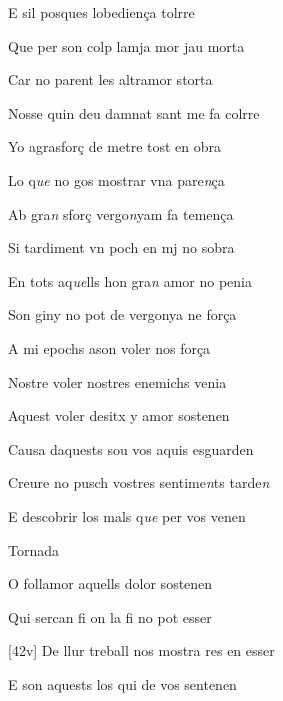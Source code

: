 \documentclass[12pt]{article}
\begin{document}
\begin{estrofa}

 E sil posques lobedien\c{c}a tolrre

 Que per son colp lamja mor jau morta

 Car no parent les altramor storta

 Nosse quin deu damnat sant me fa colrre

 Yo agrasfor\c{c} de metre tost en obra

 Lo q\textit{ue} no gos mostrar vna pare\textit{n}\c{c}a

 Ab gra\textit{n} sfor\c{c} vergo\textit{n}yam fa temen\c{c}a

 Si tardiment vn poch en mj no sobra

\end{estrofa}



\begin{estrofa}

 En tots aq\textit{ue}lls hon gra\textit{n} amor no penia

 Son giny no pot de vergonya ne for\c{c}a

 A mi epochs ason voler nos for\c{c}a

 Nostre voler nostres enemichs venia

 Aquest voler desitx y amor sostenen

 Causa daquests sou vos aquis esguarden

 Creure no pusch vostres sentime\textit{n}ts tarde\textit{n}

 E descobrir los mals q\textit{ue} per vos venen

\end{estrofa}


\begin{estrofaExtra}%




\begin{tornada}

Tornada

\end{tornada}


\end{estrofaExtra}


\begin{estrofa}

 O follamor aquells dolor sostenen

 Qui sercan fi on la fi no pot esser

 [42v] De llur treball nos mostra res en esser

 E son aquests los qui de vos sentenen

\end{estrofa}
\end{document}
